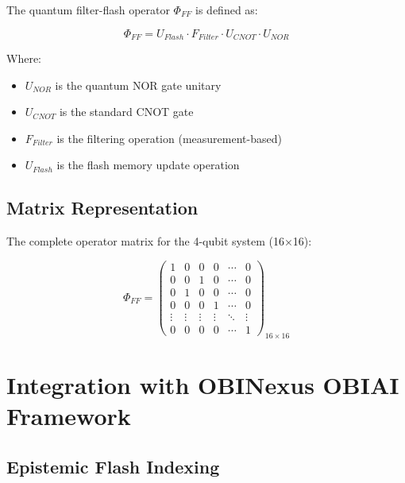 \documentclass[11pt,a4paper]{article}
\begin{document}
The quantum filter-flash operator $\Phi_{FF}$ is defined as:

\begin{equation}
\Phi_{FF} = U_{Flash} \cdot F_{Filter} \cdot U_{CNOT} \cdot U_{NOR}
\end{equation}

Where:
\begin{itemize}
    \item $U_{NOR}$ is the quantum NOR gate unitary
    \item $U_{CNOT}$ is the standard CNOT gate
    \item $F_{Filter}$ is the filtering operation (measurement-based)
    \item $U_{Flash}$ is the flash memory update operation
\end{itemize}

\subsection{Matrix Representation}

The complete operator matrix for the 4-qubit system (16×16):

\begin{equation}
\Phi_{FF} = \begin{pmatrix}
1 & 0 & 0 & 0 & \cdots & 0 \\
0 & 0 & 1 & 0 & \cdots & 0 \\
0 & 1 & 0 & 0 & \cdots & 0 \\
0 & 0 & 0 & 1 & \cdots & 0 \\
\vdots & \vdots & \vdots & \vdots & \ddots & \vdots \\
0 & 0 & 0 & 0 & \cdots & 1
\end{pmatrix}_{16 \times 16}
\end{equation}

\section{Integration with OBINexus OBIAI Framework}

\subsection{Epistemic Flash Indexing}
\end{document}
